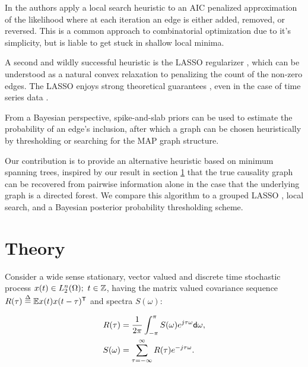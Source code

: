 \documentclass[12pt]{article}
\begin{document}
In \cite{bach2004learning} the authors apply a local search heuristic
to an AIC penalized approximation of the likelihood where at each
iteration an edge is either added, removed, or reversed.  This is a
common approach to combinatorial optimization due to it's simplicity,
but is liable to get stuck in shallow local minima.

A second and wildly successful heuristic is the LASSO regularizer
\cite{tibshirani1996regression}, which can be understood as a natural
convex relaxation to penalizing the count of the non-zero edges.  The
LASSO enjoys strong theoretical guarantees \cite{wainwright2009sharp},
even in the case of time series data \cite{basu2015}
\cite{wong2016lasso}.

From a Bayesian perspective, spike-and-slab priors can be used to
estimate the probability of an edge's inclusion, after which a graph
can be chosen heuristically by thresholding or searching for the MAP
graph structure.

Our contribution is to provide an alternative heuristic based on
minimum spanning trees, inspired by our result in section
\ref{sec:theory} that the true causality graph can be recovered from
pairwise information alone in the case that the underlying graph is a
directed forest.  We compare this algorithm to a grouped LASSO
\cite{yuan2006model}, local search, and a Bayesian posterior
probability thresholding scheme.


\section{Theory}
\label{sec:theory}
Consider a wide sense stationary, vector valued and discrete time
stochastic process $x(t) \in L^n_2(\Omega);\ t \in \mathbb{Z}$, having the matrix
valued covariance sequence $R(\tau) \overset{\Delta}{=} \mathbb{E} x(t)x(t - \tau)^{\mathsf{T}}$ and spectra $S(\omega)$:

\begin{equation}
  \label{eqn:fourier_pair}
  \begin{aligned}
    R(\tau) &= \frac{1}{2\pi}\int_{-\pi}^\pi S(\omega) e^{j\tau\omega}\mathsf{d} \omega,\\
    S(\omega) &= \sum_{\tau=-\infty}^\infty R(\tau)e^{-j\tau\omega}.
  \end{aligned}
\end{equation}
\end{document}
